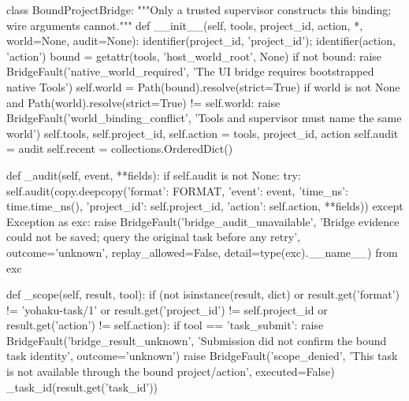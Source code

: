 class BoundProjectBridge:
    """Only a trusted supervisor constructs this binding; wire arguments cannot."""
    def __init__(self, tools, project_id, action, *, world=None, audit=None):
        identifier(project_id, 'project_id'); identifier(action, 'action')
        bound = getattr(tools, 'host_world_root', None)
        if not bound:
            raise BridgeFault('native_world_required', 'The UI bridge requires bootstrapped native Tools')
        self.world = Path(bound).resolve(strict=True)
        if world is not None and Path(world).resolve(strict=True) != self.world:
            raise BridgeFault('world_binding_conflict', 'Tools and supervisor must name the same world')
        self.tools, self.project_id, self.action = tools, project_id, action
        self.audit = audit
        self.recent = collections.OrderedDict()

    def _audit(self, event, **fields):
        if self.audit is not None:
            try:
                self.audit(copy.deepcopy({'format': FORMAT, 'event': event,
                    'time_ns': time.time_ns(), 'project_id': self.project_id,
                    'action': self.action, **fields}))
            except Exception as exc:
                raise BridgeFault('bridge_audit_unavailable', 'Bridge evidence could not be saved; query the original task before any retry',
                                  outcome='unknown', replay_allowed=False, detail=type(exc).__name__) from exc

    def _scope(self, result, tool):
        if (not isinstance(result, dict) or result.get('format') != 'yohaku-task/1'
                or result.get('project_id') != self.project_id or result.get('action') != self.action):
            if tool == 'task_submit':
                raise BridgeFault('bridge_result_unknown', 'Submission did not confirm the bound task identity', outcome='unknown')
            raise BridgeFault('scope_denied', 'This task is not available through the bound project/action', executed=False)
        _task_id(result.get('task_id'))

